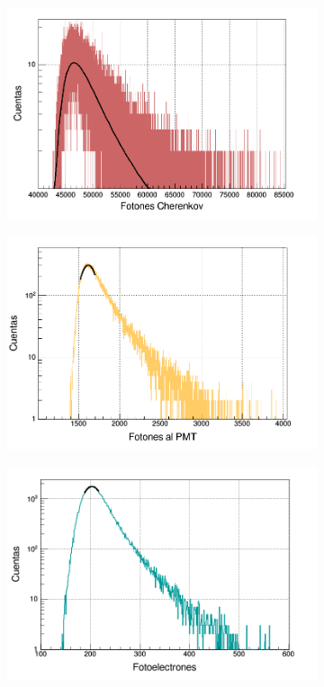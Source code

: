 \documentclass[12pt,oneside,openany,letter]{book}
\begin{document}
\begin{figure}
    \centering
    \begin{subfigure}{0.45\textwidth}
        \includegraphics[width=\textwidth]{cherenkov_total_mu.png}
        \caption{}
        \label{cherenkov_total_mu}
    \end{subfigure}
    \begin{subfigure}{0.45\textwidth}
        \includegraphics[width=\textwidth]{al_pmt_mu.png}
        \caption{}
        \label{al_pmt_mu}
    \end{subfigure}
    \begin{subfigure}{0.45\textwidth}
        \includegraphics[width=\textwidth]{fotoelectrones_vem.png}

\end{subfigure}
\end{figure}
\end{document}
